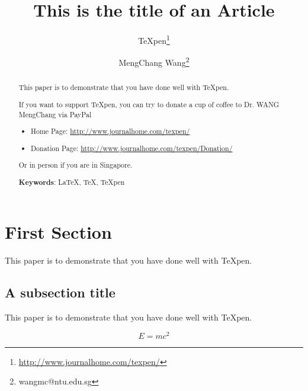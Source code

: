 \documentclass[11pt,a4paper]{article} %
\title{This is the title of an Article}
\author[1]{ {\TeX}pen\thanks{\href{http://www.journalhome.com/texpen/}{http://www.journalhome.com/texpen/}}}
\author[2]{MengChang Wang\thanks{wangmc@ntu.edu.sg}}
\affil[1]{{\small \textit{http://www.journalhome.com/texpen/}}}
\affil[2]{{\small \textit{Nanyang Technological University, Singapore}}}
\begin{document}

\maketitle

\begin{abstract}
This paper is to demonstrate that you have done well with {\TeX}pen.

If you want to support {\TeX}pen, you can try to donate a cup of coffee to Dr. WANG MengChang via PayPal

\begin {itemize}
\item Home Page: {\href{http://www.journalhome.com/texpen/}{http://www.journalhome.com/texpen/}}
\item Donation Page: {\href{http://www.journalhome.com/texpen/Donation/}{http://www.journalhome.com/texpen/Donation/}}
\end{itemize}

Or in person if you are in Singapore.

\textbf{Keywords}: \LaTeX, \TeX, {\TeX}pen
\end{abstract}

\clearpage



\section{First Section}

This paper is to demonstrate that you have done well with {\TeX}pen.



\subsection{A subsection title}
This paper is to demonstrate that you have done well with {\TeX}pen.

$$
E = mc^{2}
$$



\centering
{}
\end{document}
